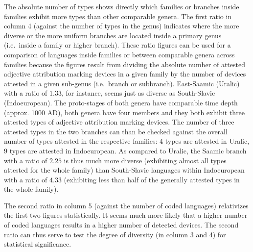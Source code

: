 The absolute number of types shows directly which families or branches inside families exhibit more types than other comparable genera. The first ratio in column 4 (against the number of types in the genus) indicates where the more diverse or the more uniform branches are located inside a primary genus (i.e.~inside a family or higher branch). These ratio figures can be used for a comparison of languages inside families or between comparable genera across families because the figures result from dividing the absolute number of  attested adjective attribution marking devices in a given family by the number of devices attested in a given sub-genus (i.e.~branch or subbranch). East-Saamic (Uralic) with a ratio of $1.33$, for instance, seems just as diverse as South-Sla\-vic (Indoeuropean). The proto-stages of both genera have comparable time depth (approx. 1000 AD), both genera have four members and they both exhibit three attested types of adjective attribution marking devices. The number of three attested types in the two branches can than be checked against the overall number of types attested in the respective families: 4 types are attested in Uralic, 9 types are attested in Indoeuropean. As compared to Uralic, the Saamic branch with a ratio of $2.25$ is thus much more diverse (exhibiting almost all types attested for the whole family) than South-Sla\-vic languages within Indoeuropean with a ratio of $4.33$ (exhibiting less than half of the generally attested types in the whole family).

The second ratio in column 5 (against the number of coded languages) relativizes the first two figures statistically. It seems much more likely that a higher number of coded languages results in a higher number of detected devices. The second ratio can thus serve to test the degree of diversity (in column 3 and 4) for statistical significance. 


